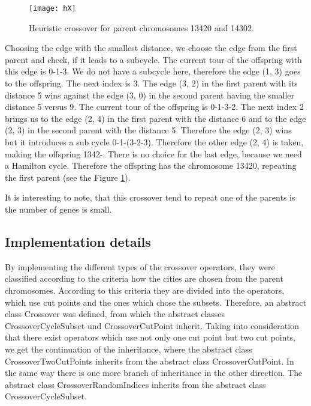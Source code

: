 \documentclass[a4paper, 12pt, headings=standardclasses]{scrartcl}
\begin{document}
\begin{figure}[!ht]
	\centering
	\texttt{[image: hX]}
	\caption{Heuristic crossover for parent chromosomes 13420 and 14302.}
	\label{hX}
\end{figure}
Choosing the edge with the smallest distance, we choose the edge from the first parent and check, if it leads to a subcycle. The current tour of the offspring with this edge is 0-1-3. We do not have a subcycle here, therefore the edge (1, 3) goes to the offspring. The next index is 3. The edge (3, 2) in the first parent with its distance 5 wins against the edge (3, 0) in the second parent having the smaller distance 5 versus 9. The current tour of the offspring is 0-1-3-2. The next index 2 brings us to the edge (2, 4) in the first parent with the distance 6 and to the edge (2, 3) in the second parent with the distance 5. Therefore the edge (2, 3) wins but it introduces a sub cycle 0-1-(3-2-3). Therefore the other edge (2, 4) is taken, making the offspring 1342-. There is no choice for the last edge, because we need a Hamilton cycle. Therefore the offspring has the chromosome 13420, repeating the first parent (see the Figure \ref{hX}).
 
It is interesting to note, that this crossover tend to repeat one of the parents is the number of genes is small.

\subsection{Implementation details}
By implementing the different types of the crossover operators, they were classified according to the criteria how the cities are chosen from the parent chromosomes. According to this criteria they are divided into the operators, which use cut points and the ones which chose the subsets. Therefore, an abstract class Crossover was defined, from which the abstract classes CrossoverCycleSubset und CrossoverCutPoint inherit. Taking into consideration that there exist operators which use not only one cut point but two cut points, we get the continuation of the inheritance, where the abstract class CrossoverTwoCutPoints inherits from the abstract class CrossoverCutPoint. In the same way there is one more branch of inheritance in the other direction. The abstract class CrossoverRandomIndices inherits from the abstract class CrossoverCycleSubset.
\end{document}
